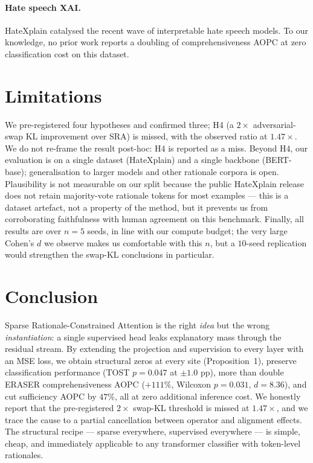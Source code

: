 \documentclass{article}
\begin{document}
\paragraph{Hate speech XAI.}
HateXplain \citep{mathew2021hatexplain} catalysed the recent wave of interpretable hate
speech models. To our knowledge, no prior work reports a doubling of comprehensiveness
AOPC at zero classification cost on this dataset.

\section{Limitations}
\label{sec:limitations}

We pre-registered four hypotheses and confirmed three; H4 (a $2{\times}$ adversarial-swap
KL improvement over SRA) is missed, with the observed ratio at $1.47{\times}$. We do not
re-frame the result post-hoc: H4 is reported as a miss. Beyond H4, our evaluation is on a
single dataset (HateXplain) and a single backbone (BERT-base); generalisation to larger
models and other rationale corpora is open. Plausibility is not measurable on our split
because the public HateXplain release does not retain majority-vote rationale tokens for
most examples --- this is a dataset artefact, not a property of the method, but it
prevents us from corroborating faithfulness with human agreement on this benchmark.
Finally, all results are over $n{=}5$ seeds, in line with our compute budget; the very
large Cohen's $d$ we observe makes us comfortable with this $n$, but a $10$-seed
replication would strengthen the swap-KL conclusions in particular.

\section{Conclusion}
\label{sec:conclusion}

Sparse Rationale-Constrained Attention is the right \emph{idea} but the wrong
\emph{instantiation}: a single supervised head leaks explanatory mass through the
residual stream. By extending the projection and supervision to every layer with an MSE
loss, we obtain structural zeros at every site (Proposition~1), preserve classification
performance (TOST $p{=}0.047$ at $\pm 1.0$ pp), more than double ERASER
comprehensiveness AOPC ($+111\%$, Wilcoxon $p{=}0.031$, $d{=}8.36$), and cut sufficiency
AOPC by $47\%$, all at zero additional inference cost. We honestly report that the
pre-registered $2{\times}$ swap-KL threshold is missed at $1.47{\times}$, and we trace
the cause to a partial cancellation between operator and alignment effects. The structural
recipe --- sparse everywhere, supervised everywhere --- is simple, cheap, and immediately
applicable to any transformer classifier with token-level rationales.



\end{document}
